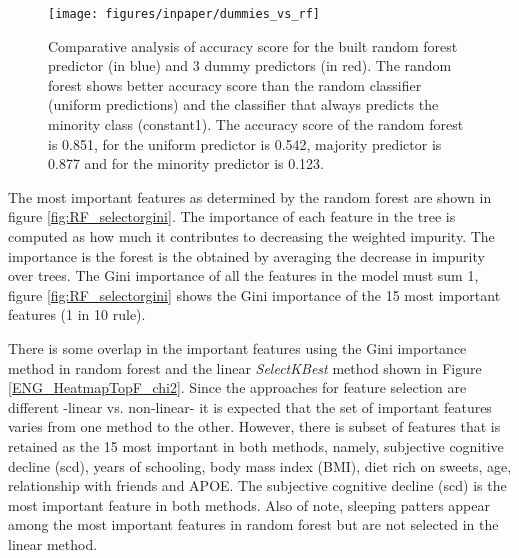 \documentclass[preprint,12pt]{elsarticle}
\begin{document}


\begin{figure}[!htb] 
        \centering
        \texttt{[image: figures/inpaper/dummies\_vs\_rf]}
        \caption{Comparative analysis of accuracy score for the built random forest predictor (in blue) and 3 dummy predictors (in red). The random forest shows better accuracy score than the random classifier (uniform predictions) and the classifier that always predicts the minority class (constant1). The accuracy score of the random forest is 0.851, for the uniform predictor is 0.542, majority predictor is 0.877 and for the minority predictor is 0.123.
        } \label{fig:dummies}
\end{figure}

The most important features as determined by the random forest are shown in figure \ref{fig:RF_selectorgini}. The importance of each feature in the tree is computed as how much it  contributes to decreasing the weighted impurity. The importance is the forest is the obtained by averaging the decrease in impurity over trees. The Gini importance of all the features in the model must sum 1, figure \ref{fig:RF_selectorgini} shows the Gini importance of the 15 most important features (1 in 10 rule).

There is some overlap in the important features using the Gini importance method in random forest and the linear \emph{SelectKBest} method shown in Figure \ref{ENG_HeatmapTopF_chi2}. Since the approaches for feature selection are different -linear vs. non-linear- it is expected that the set of important features varies from one method to the other. However, there is subset of features that is retained as the 15 most important in both methods, namely, subjective cognitive decline (scd), years of schooling, body mass index (BMI), diet rich on sweets, age, relationship with friends and APOE. The subjective cognitive decline (scd) is the most important feature in both methods. Also of note, sleeping patters appear among the most important features in random forest but are not selected in the linear method. 
\end{document}
